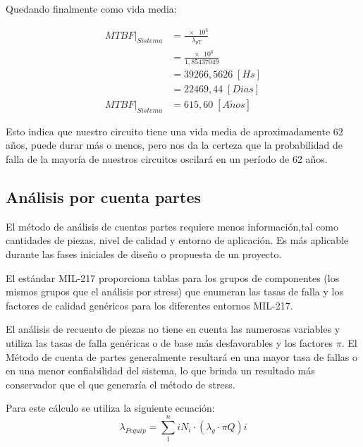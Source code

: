 \documentclass{article}
\begin{document}
Quedando finalmente como vida media:

\begin{align*}
{MTBF}\bigr|_{Sistema} 	&= \frac{\num{e6}}{\lambda_{pT}} \\
						&= \frac{\num{e6}}{1,85437049 } \\
						&= 39266,5626  \; [Hs] \\
						&= 22469,44  \;   [Dias] \\
{MTBF}\bigr|_{Sistema}	&= 615,60 \;  [A\tilde{n}os] 
\end{align*}

Esto indica que nuestro circuito tiene una vida media de aproximadamente 62 años, puede durar más o menos, pero nos da la certeza que  la probabilidad de falla de la mayoría de nuestros circuitos oscilará en un período de 62 años.

\subsection{Análisis por cuenta partes}
El método de análisis de cuentas partes requiere menos información,tal como cantidades de piezas, nivel de calidad y entorno de aplicación. Es más aplicable durante las fases iniciales de diseño o propuesta de un proyecto. 

El estándar MIL-217 proporciona tablas para los grupos de componentes (los mismos grupos que el análisis por stress) que enumeran las tasas de falla y los factores de calidad genéricos para los diferentes entornos MIL-217.

El análisis de recuento de piezas no tiene en cuenta las numerosas variables y utiliza las tasas de falla genéricas o de base más desfavorables y los factores $\pi$. El Método de cuenta de partes generalmente resultará en una mayor tasa de fallas o en una menor confiabilidad del sistema, lo que brinda un resultado más conservador que el que generaría el método de stress.

Para este cálculo se utiliza la siguiente ecuación:
\begin{equation}
	\lambda_{Pequip} = \sum_{1}^{n} i N_i  \cdot (\lambda_g  \cdot \pi Q) i
\end{equation}
\end{document}
